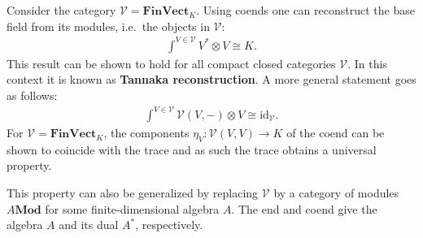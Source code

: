     \begin{property}
        Consider the category $\mathcal{V}=\mathbf{FinVect}_K$. Using coends one can reconstruct the base field from its modules, i.e.~the objects in $\mathcal{V}$:
        \begin{gather}
            \int^{V\in\mathcal{V}}V^*\otimes V\cong K.
        \end{gather}
        This result can be shown to hold for all compact closed categories $\mathcal{V}$. In this context it is known as \textbf{Tannaka reconstruction}. A more general statement goes as follows:
        \begin{gather}
            \int^{V\in\mathcal{V}}\mathcal{V}(V, -)\otimes V\cong\mathrm{id}_\mathcal{V}.
        \end{gather}
        For $\mathcal{V}=\mathbf{FinVect}_K$, the components $\eta_V:\mathcal{V}(V,V)\rightarrow K$ of the coend can be shown to coincide with the trace and as such the trace obtains a universal property.
    \end{property}
    \begin{remark}
        This property can also be generalized by replacing $\mathcal{V}$ by a category of modules $A\mathbf{Mod}$ for some finite-dimensional algebra $A$. The end and coend give the algebra $A$ and its dual $A^*$, respectively.
    \end{remark}


